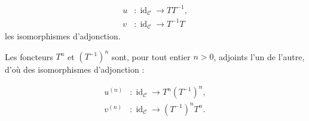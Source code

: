 \begin{equation}
  \begin{aligned}
    u&\colon\operatorname{id}_{\mathcal C}\longrightarrow TT^{-1},\\
    v&\colon\operatorname{id}_{\mathcal C}\longrightarrow T^{-1}T
  \end{aligned}
  \tag{1.5.14.1}
\end{equation}
les isomorphismes d'adjonction.

Les foncteurs $T^n$ et $(T^{-1})^n$ sont, pour tout entier $n>0$,
adjoints l'un de l'autre, d'où des isomorphismes d'adjonction :

\begin{equation}
  \begin{aligned}
    u^{(n)}&\colon\operatorname{id}_{\mathcal C}
      \longrightarrow T^n(T^{-1})^n,\\
    v^{(n)}&\colon\operatorname{id}_{\mathcal C}
      \longrightarrow (T^{-1})^nT^n.
  \end{aligned}
  \tag{1.5.14.2}
\end{equation}
